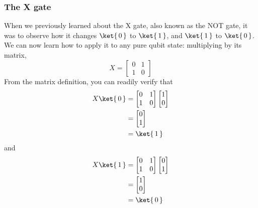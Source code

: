 \documentclass{article}
\theoremstyle{definition}
\newcommand{\kz}[1]{\ket{\,#1\,}}
\begin{document}
\subsubsection{The X gate}
When we previously learned about the X gate, also known as the NOT gate, it was to observe how it changes $\kz0$ to $\kz1$, and $\kz1$ to $\kz0$.
We can now learn how to apply it to any pure qubit state: multiplying by its matrix,
\begin{equation}
	X = \begin{bmatrix}
		0 & 1\\
		1 & 0
	\end{bmatrix}
\end{equation}
From the matrix definition, you can readily verify that
\begin{align}
	X \kz0 &= \begin{bmatrix}
		0 & 1\\
		1 & 0
	\end{bmatrix} \begin{bmatrix}
		1\\
		0
	\end{bmatrix}\\
	&= \begin{bmatrix}
		0\\
		1
	\end{bmatrix}\\
	&= \kz1
\end{align}
and
\begin{align}
	X \kz1 &= \begin{bmatrix}
		0 & 1\\
		1 & 0
	\end{bmatrix} \begin{bmatrix}
		0\\
		1
	\end{bmatrix}\\
	&= \begin{bmatrix}
		1\\
		0
	\end{bmatrix}\\
	&= \kz0
\end{align}
\end{document}
